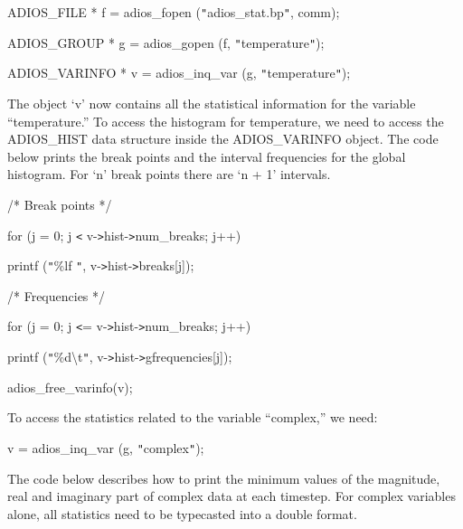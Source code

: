 \vspace{10pt}
ADIOS\_FILE * f = adios\_fopen (\texttt{"}adios\_stat.bp\texttt{"}, comm);

\vspace{10pt}
ADIOS\_GROUP * g = adios\_gopen (f, \texttt{"}temperature\texttt{"});

\vspace{10pt}
ADIOS\_VARINFO * v = adios\_inq\_var (g, \texttt{"}temperature\texttt{"});

\vspace{23pt}
The object `v' now contains all the statistical information for the variable ``temperature.'' 
To access the histogram for temperature, we need to access the ADIOS\_HIST data 
structure inside the ADIOS\_VARINFO object. The code below prints the break points 
and the interval frequencies for the global histogram. For `n' break points there 
are `n + 1' intervals.

\vspace{10pt}
/* Break points */

\vspace{10pt}
for (j = 0; j \texttt{<} v-\texttt{>}hist-\texttt{>}num\_breaks; j++)

\vspace{10pt}
\parindent=28pt
printf (\texttt{"}\%lf \texttt{"}, v-\texttt{>}hist-\texttt{>}breaks[j]);

\vspace{10pt}
\parindent=0pt
/* Frequencies */

\vspace{10pt}
for (j = 0; j \texttt{<}= v-\texttt{>}hist-\texttt{>}num\_breaks; j++)

\vspace{10pt}
\parindent=28pt
printf (\texttt{"}\%d\textbackslash{}t\texttt{"}, v-\texttt{>}hist-\texttt{>}gfrequencies[j]);

\vspace{10pt}
\parindent=0pt
adios\_free\_varinfo(v);

\vspace{23pt}
To access the statistics related to the variable ``complex,'' we need:

\vspace{10pt}
v = adios\_inq\_var (g, \texttt{"}complex\texttt{"});

\vspace{23pt}
The code below describes how to print the minimum values of the magnitude, real 
and imaginary part of complex data at each timestep. For complex variables alone, 
all statistics need to be typecasted into a double format.

